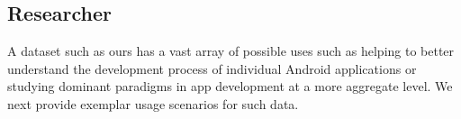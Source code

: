 \documentclass[journal,transmag]{IEEEtran}
\newcommand{\todo}[1]{\textcolor{cyan}{\textbf{[#1]}}}
\newcommand{\dan}[1]{\textcolor{blue}{{\it [Dan says: #1]}}}
\begin{document}

















%



%







\subsection{Researcher}

%


A dataset such as ours has a vast array of possible uses such as helping to better understand the development process of individual Android applications or studying dominant paradigms in app development at a more aggregate level. We next provide exemplar usage scenarios for such data. \\
\end{document}
